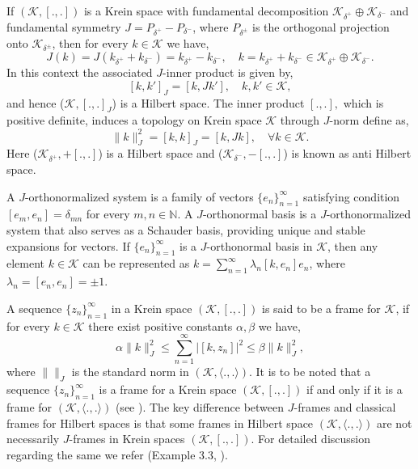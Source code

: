 \documentclass[article,12pt]{amsart}
\begin{document}
If $(\mathcal K, [.,.])$ is a Krein space with fundamental decomposition $\mathcal K_{\delta^+} \oplus \mathcal K_{\delta^-}$ and  fundamental  symmetry  $J = P_{\delta^+} - P_{\delta^-}$, where $P_{\delta^{\pm}}$ is the orthogonal  projection onto $\mathcal{K}_{\delta^{\pm}}$, then for every $k \in \mathcal K$ we have, $$J(k) = J(k_{\delta^+}+ k_{\delta^-}) = k_{\delta^+} - k_{\delta^-}, \quad k = k_{\delta^+}+ k_{\delta^-}\in \mathcal K_{\delta^+} \oplus \mathcal K_{\delta^-}. $$ In this context the associated $J$-inner product is given by,
$$[k, k']_J = [k, Jk'],  \quad k, k' \in \mathcal{K},$$ and hence ($\mathcal{K}, [., .]_J$) is a Hilbert space. The inner product $[., .],$ which is positive definite, induces a topology on Krein space $\mathcal{K}$ through $J$-norm define as, $$\|k\|_{J}^2 = [k, k]_J = [k, Jk], \quad \forall k \in \mathcal{K}.$$
Here ($\mathcal{K}_{\delta^+}, +[., .]$) is a Hilbert space and ($\mathcal{K}_{\delta^-}, -[., .]$)  is known as anti Hilbert space.

A $J$-orthonormalized system is a family of vectors $\{e_n\}_{n=1}^\infty$ satisfying condition $[e_m, e_n]=\delta_{mn}$ for every $m, n \in \mathbb N$. A $J$-orthonormal basis is a $J$-orthonormalized system that also serves as a Schauder basis, providing unique and stable expansions for vectors. If $\{e_n\}_{n=1}^\infty$ is a $J$-orthonormal basis in $\mathcal K$, then any element $k \in \mathcal K$ can be represented as $k=\sum\limits_{n=1}^\infty \lambda_n [k, e_n] e_n$, where $\lambda_n=[e_n, e_n]=\pm 1$.



A sequence $\{z_n\}_{n=1}^\infty$ in a Krein space $(\mathcal K, [.,.])$ is said to be a frame for $\mathcal K$, if for every $k \in \mathcal K$ there exist positive constants $\alpha, \beta$ we have,
\begin{equation}
\alpha \|k\|_{J}^2 \leq \sum\limits_{n=1}^\infty |[k, z_n]|^2 \leq \beta \|k\|_{J}^2,
\end{equation}
where $\|\|_{J}$ is the standard norm in $(\mathcal K, \langle .,. \rangle)$. It is to be noted that a sequence $\{z_n\}_{n=1}^\infty$ is a frame for a Krein space $(\mathcal K, [.,.])$ if and only if it is a frame for $(\mathcal K, \langle .,. \rangle)$ (see \cite{Ga}). The key difference between $J$-frames and classical frames for Hilbert spaces is that some frames in Hilbert space $(\mathcal K, \langle .,. \rangle)$  are not necessarily $J$-frames in Krein spaces $(\mathcal K, [.,.])$. For detailed discussion regarding the same we refer (Example 3.3, \cite{Gi12}).\\
\end{document}
